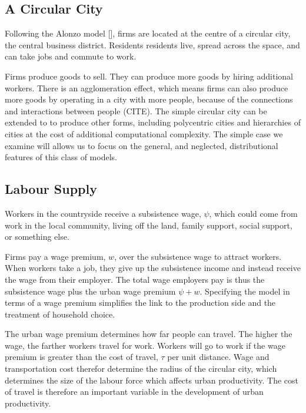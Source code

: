 \subsection{A Circular City}

Following the Alonzo model [], firms are located at the centre of a circular city, the central business district. Residents residents live, spread across the space, and can take jobs and commute to work.

Firms produce goods to sell. They can produce more goods by hiring additional workers. 
There is an agglomeration effect, which means firms can also produce more goods by operating in a city with more people, because of the connections and interactions between people (CITE). 
The simple circular city can be extended to to produce other forms, including polycentric cities and hierarchies of cities at the cost of additional computational complexity. The simple case we examine will allows us to focus on the general, and neglected, distributional features of this class of models.

\subsection{Labour Supply}


Workers in the countryside receive a subsistence wage, $\psi$, which could come from work in the local community, living off the land, family support, social support, or something else. %

Firms pay a wage premium, $w$, over the subsistence wage to attract workers. 
When workers take a job, they give up the subsistence income and instead receive the wage from their employer. 
The total wage employers pay is thus the subsistence wage plus the urban wage premium  $\psi + w$.
Specifying the model in terms of a wage premium simplifies the link to the production side and the treatment of household choice.

The urban wage premium determines how far people can travel. The higher the wage, the farther workers travel for work. 
Workers will go to work if the wage premium is greater than the cost of travel, $\tau$ per unit distance. 
Wage and transportation cost therefor determine the radius of the circular city, which determines the size of the labour force which affects urban productivity.  The cost of travel is therefore an important variable in the development of urban productivity. 

